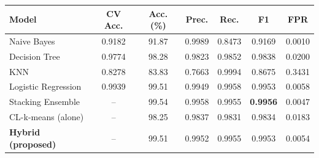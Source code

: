 \begin{tabular}{lcccccc}
\toprule
Model & CV Acc. & Acc. (\%) & Prec. & Rec. & F1 & FPR\\
\midrule
Naive Bayes & 0.9182 & 91.87 & 0.9989 & 0.8473 & 0.9169 & 0.0010\\
Decision Tree & 0.9774 & 98.28 & 0.9823 & 0.9852 & 0.9838 & 0.0200\\
KNN & 0.8278 & 83.83 & 0.7663 & 0.9994 & 0.8675 & 0.3431\\
Logistic Regression & 0.9939 & 99.51 & 0.9949 & 0.9958 & 0.9953 & 0.0058\\
Stacking Ensemble & -- & 99.54 & 0.9958 & 0.9955 & \textbf{0.9956} & 0.0047\\
\midrule
CL-k-means (alone) & -- & 98.25 & 0.9837 & 0.9831 & 0.9834 & 0.0183\\
\textbf{Hybrid (proposed)} & -- & 99.51 & 0.9952 & 0.9955 & 0.9953 & 0.0054\\
\bottomrule
\end{tabular}

